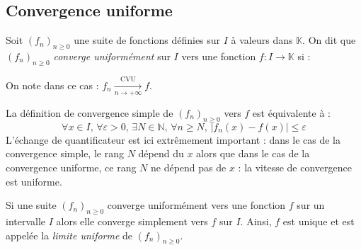 \documentclass[french,11pt,twoside]{VcCours}
\begin{document}
\subsection{Convergence uniforme}

\begin{Definition}{} Soit $(f_n)_{n \geq 0}$ une suite de fonctions définies sur $I$ à valeurs dans $\mathbb{K}$. On dit que $(f_n)_{n \geq 0}$ \emph{converge uniformément} sur $I$ vers une fonction $f : I \rightarrow \mathbb{K}$ si : 
$$\phantom{\forall \varepsilon >0, \, \exists N \in \mathbb{N}, \, \forall n \geq N, \, \forall x \in I, \, \vert f_n(x)-f(x) \vert \leq \varepsilon}$$
On note dans ce cas : $f_n \xrightarrow[n \rightarrow + \infty]{\textrm{CVU}} f$.
\end{Definition}

%


\begin{Remarque}{} 
La définition de convergence simple de $(f_n)_{n \geq 0}$ vers $f$ est équivalente à :
$$ \forall x \in I, \,  \forall \varepsilon >0, \, \exists N \in \mathbb{N}, \, \forall n \geq N,  \, \vert f_n(x)-f(x) \vert \leq \varepsilon$$
L'échange de quantificateur est ici extrêmement important : dans le cas de la convergence simple, le rang $N$ dépend du $x$ alors que dans le cas de la convergence uniforme, ce rang $N$ ne dépend pas de $x$ : la \og vitesse \fg de convergence est uniforme.
\end{Remarque}

\begin{Proposition}{}  Si une suite $(f_n)_{n \geq 0}$ converge uniformément vers une fonction $f$ sur un intervalle $I$ alors elle converge simplement vers $f$ sur $I$. Ainsi, $f$ est unique et est appelée la \emph{limite uniforme} de $(f_n)_{n \geq 0}$.
\end{Proposition}
\begin{Demonstration}{}

\vspace*{8cm}
\end{Demonstration}
\end{document}
